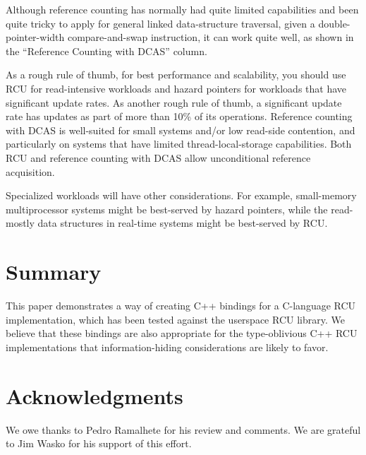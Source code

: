 \documentclass[letterpaper,10pt]{article}
\begin{document}
Although reference counting has normally had quite limited capabilities
and been quite tricky to apply for general linked data-structure
traversal, given a double-pointer-width compare-and-swap instruction,
it can work quite well, as shown in the ``Reference Counting with DCAS''
column.

As a rough rule of thumb, for best performance and scalability, you
should use RCU for read-intensive workloads and hazard pointers for
workloads that have significant update rates.
As another rough rule of thumb, a significant update rate has updates
as part of more than 10\% of its operations.
Reference counting with DCAS is well-suited for small systems and/or
low read-side contention, and particularly on systems that have limited
thread-local-storage capabilities.
Both RCU and reference counting with DCAS allow unconditional reference
acquisition.

Specialized workloads will have other considerations.
For example, small-memory multiprocessor systems might be best-served by
hazard pointers, while the read-mostly data structures in real-time
systems might be best-served by RCU.

\section{Summary}
\label{sec:Summary}

This paper demonstrates a way of creating C++ bindings for a C-language
RCU implementation, which has been tested against the userspace RCU
library.
We believe that these bindings are also appropriate for the type-oblivious
C++ RCU implementations that information-hiding considerations are likely
to favor.

\section*{Acknowledgments}

We owe thanks to Pedro Ramalhete for his review and comments.
We are grateful to Jim Wasko for his support of this effort.

%
%

%







\end{document}

